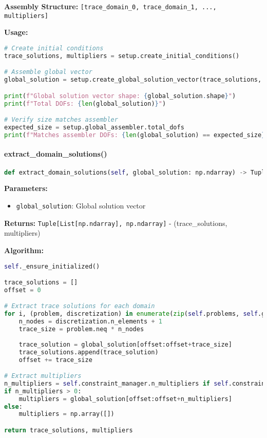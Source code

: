 \textbf{Assembly Structure:} \texttt{[trace\_domain\_0, trace\_domain\_1, ..., multipliers]}

\textbf{Usage:}
\begin{lstlisting}[language=Python, caption=Global Vector Assembly Usage]
# Create initial conditions
trace_solutions, multipliers = setup.create_initial_conditions()

# Assemble global vector
global_solution = setup.create_global_solution_vector(trace_solutions, multipliers)

print(f"Global solution vector shape: {global_solution.shape}")
print(f"Total DOFs: {len(global_solution)}")

# Verify size matches assembler
expected_size = setup.global_assembler.total_dofs
print(f"Matches assembler DOFs: {len(global_solution) == expected_size}")
\end{lstlisting}

\paragraph{extract\_domain\_solutions()}
\begin{lstlisting}[language=Python, caption=Extract Domain Solutions Method]
def extract_domain_solutions(self, global_solution: np.ndarray) -> Tuple[List[np.ndarray], np.ndarray]
\end{lstlisting}

\textbf{Parameters:}
\begin{itemize}
    \item \texttt{global\_solution}: Global solution vector
\end{itemize}

\textbf{Returns:} \texttt{Tuple[List[np.ndarray], np.ndarray]} - (trace\_solutions, multipliers)

\textbf{Algorithm:}
\begin{lstlisting}[language=Python, caption=Domain Solution Extraction Algorithm]
self._ensure_initialized()

trace_solutions = []
offset = 0

# Extract trace solutions for each domain
for i, (problem, discretization) in enumerate(zip(self.problems, self.global_discretization.spatial_discretizations)):
    n_nodes = discretization.n_elements + 1
    trace_size = problem.neq * n_nodes
    
    trace_solution = global_solution[offset:offset+trace_size]
    trace_solutions.append(trace_solution)
    offset += trace_size

# Extract multipliers
n_multipliers = self.constraint_manager.n_multipliers if self.constraint_manager else 0
if n_multipliers > 0:
    multipliers = global_solution[offset:offset+n_multipliers]
else:
    multipliers = np.array([])

return trace_solutions, multipliers
\end{lstlisting}

